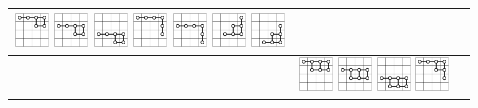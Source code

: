 \documentclass[runningheads]{llncs}
\begin{document}
\begin{tabular}{p{1.2cm}l@{~~}r}
\includegraphics[width=0.9cm]{figures/NTuple-62.pdf}
\includegraphics[width=0.9cm]{figures/NTuple-63.pdf}
\includegraphics[width=0.9cm]{figures/NTuple-64.pdf}
\includegraphics[width=0.9cm]{figures/NTuple-65.pdf}
\includegraphics[width=0.9cm]{figures/NTuple-66.pdf}
\includegraphics[width=0.9cm]{figures/NTuple-67.pdf}
\includegraphics[width=0.9cm]{figures/NTuple-68.pdf}
& \raisebox{10pt}{$\begin{array}{r}
 \mbox{no VSE, 2 stages}\\
612\,220\,032
 \end{array}$}
\\\hline
\raisebox{15pt}{\textsf{NT7}}
&
\includegraphics[width=0.9cm]{figures/NTuple-70.pdf}
\includegraphics[width=0.9cm]{figures/NTuple-71.pdf}
\includegraphics[width=0.9cm]{figures/NTuple-72.pdf}
\includegraphics[width=0.9cm]{figures/NTuple-73.pdf}

\end{tabular}
\end{document}
